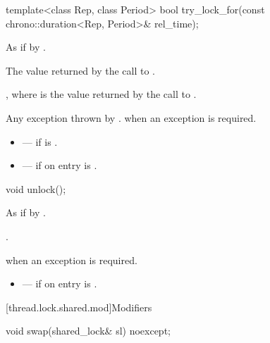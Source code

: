 %
\begin{itemdecl}
template<class Rep, class Period>
  bool try_lock_for(const chrono::duration<Rep, Period>& rel_time);
\end{itemdecl}

\begin{itemdescr}
\pnum
\effects As if by .

\pnum
\returns The value returned by the call to .

\pnum
\ensures {}, where  is the value returned by the call to .

\pnum
\throws Any exception thrown by .  when an exception is required.

\pnum
\errors
\begin{itemize}
\item {} --- if  is .
\item {} --- if on entry  is
.
\end{itemize}
\end{itemdescr}

%
\begin{itemdecl}
void unlock();
\end{itemdecl}

\begin{itemdescr}
\pnum
\effects As if by .

\pnum
\ensures {}.

\pnum
\throws {} when an exception is required.

\pnum
\errors
\begin{itemize}
\item {} --- if on entry  is
.
\end{itemize}
\end{itemdescr}

[thread.lock.shared.mod]{Modifiers}

%
\begin{itemdecl}
void swap(shared_lock& sl) noexcept;
\end{itemdecl}

